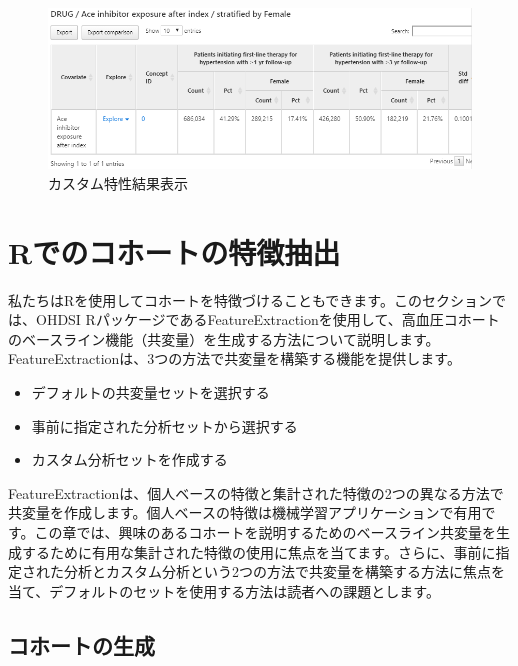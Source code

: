 \documentclass[
  11pt]{book}
\providecommand{\tightlist}{%
  \setlength{\itemsep}{0pt}\setlength{\parskip}{0pt}}
\theoremstyle{definition}
\theoremstyle{definition}
\theoremstyle{definition}
\theoremstyle{definition}
\theoremstyle{remark}
\begin{document}
\begin{figure}

{\centering \includegraphics[width=1\linewidth]{images/Characterization/atlasCharacterizationCustomFeatureResults} 

}

\caption{カスタム特性結果表示}\label{fig:atlasCharacterizationCustomFeatureResults}
\end{figure}

\section{Rでのコホートの特徴抽出}\label{rux3067ux306eux30b3ux30dbux30fcux30c8ux306eux7279ux5fb4ux62bdux51fa}

私たちはRを使用してコホートを特徴づけることもできます。このセクションでは、OHDSI RパッケージであるFeatureExtractionを使用して、高血圧コホートのベースライン機能（共変量）を生成する方法について説明します。FeatureExtractionは、3つの方法で共変量を構築する機能を提供します。 

\begin{itemize}
\tightlist
\item
  デフォルトの共変量セットを選択する
\item
  事前に指定された分析セットから選択する
\item
  カスタム分析セットを作成する
\end{itemize}

FeatureExtractionは、個人ベースの特徴と集計された特徴の2つの異なる方法で共変量を作成します。個人ベースの特徴は機械学習アプリケーションで有用です。この章では、興味のあるコホートを説明するためのベースライン共変量を生成するために有用な集計された特徴の使用に焦点を当てます。さらに、事前に指定された分析とカスタム分析という2つの方法で共変量を構築する方法に焦点を当て、デフォルトのセットを使用する方法は読者への課題とします。

\subsection{コホートの生成}\label{ux30b3ux30dbux30fcux30c8ux306eux751fux6210}
\end{document}
